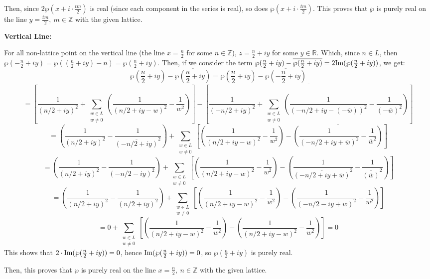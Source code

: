 \documentclass{article}
\begin{document}
\begin{itemize}
    Then, since $2\wp(x+i\cdot\frac{tm}{2})$ is real (since each component in the series is real), so does $\wp(x+i\cdot\frac{tm}{2})$. This proves that $\wp$ is purely real on the line $y=\frac{tm}{2},\ m\in\mathbb{Z}$ with the given lattice.

    \hfil

    \textbf{Vertical Line:}

    For all non-lattice point on the vertical line (the line $x=\frac{n}{2}$ for some $n\in\mathbb{Z}$), $z=\frac{n}{2}+iy$ for some $y\in\mathbb{R}$. Which, since $n\in L$, then $\wp(-\frac{n}{2}+iy)=\wp((\frac{n}{2}+iy)-n)=\wp(\frac{n}{2}+iy)$. Then, if we consider the term $\wp(\frac{n}{2}+iy)-\overline{\wp(\frac{n}{2}+iy)}=2\textmd{Im}(\wp(\frac{n}{2}+iy))$, we get:
    $$\wp\left(\frac{n}{2}+iy\right)-\overline{\wp\left(\frac{n}{2}+iy\right)}=\wp\left(\frac{n}{2}+iy\right)-\overline{\wp\left(-\frac{n}{2}+iy\right)}$$
    $$ = \left[\frac{1}{(n/2+iy)^2}+\sum_{\substack{w\in L\\w\neq 0}}\left(\frac{1}{(n/2+iy-w)^2}-\frac{1}{w^2}\right)\right]-\overline{\left[\frac{1}{(-n/2+iy)^2}+\sum_{\substack{w\in L\\w\neq 0}}\left(\frac{1}{(-n/2+iy-(-\overline{w}))^2}-\frac{1}{(-\overline{w}) ^2}\right)\right]}$$
    $$=\left(\frac{1}{(n/2+iy)^2}-\frac{1}{\overline{(-n/2+iy)}^2}\right)+\sum_{\substack{w\in L\\w\neq 0}}\left[\left(\frac{1}{(n/2+iy-w)^2}-\frac{1}{w^2}\right)-\overline{\left(\frac{1}{(-n/2+iy+\overline{w})^2}-\frac{1}{\overline{w}^2}\right)}\right]$$
    $$=\left(\frac{1}{(n/2+iy)^2}-\frac{1}{(-n/2-iy)^2}\right)+\sum_{\substack{w\in L\\w\neq 0}}\left[\left(\frac{1}{(n/2+iy-w)^2}-\frac{1}{w^2}\right)-\left(\frac{1}{\overline{(-n/2+iy+\overline{w})}^2}-\frac{1}{\overline{(\overline{w})}^2}\right)\right]$$
    $$=\left(\frac{1}{(n/2+iy)^2}-\frac{1}{(n/2+iy)^2}\right)+\sum_{\substack{w\in L\\w\neq 0}}\left[\left(\frac{1}{(n/2+iy-w)^2}-\frac{1}{w^2}\right)-\left(\frac{1}{(-n/2-iy+w)^2}-\frac{1}{w^2}\right)\right]$$
    $$=0+\sum_{\substack{w\in L\\w\neq 0}}\left[\left(\frac{1}{(n/2+iy-w)^2}-\frac{1}{w^2}\right)-\left(\frac{1}{(n/2+iy-w)^2}-\frac{1}{w^2}\right)\right]=0$$
    This shows that $2\cdot \textmd{Im}(\wp(\frac{n}{2}+iy)) = 0$, hence $\textmd{Im}(\wp(\frac{n}{2}+iy)) = 0$, so $\wp(\frac{n}{2}+iy)$ is purely real. 
    
    Then, this proves that $\wp$ is purely real on the line $x=\frac{n}{2},\ n\in\mathbb{Z}$ with the given lattice.
    

\end{itemize}
\end{document}
